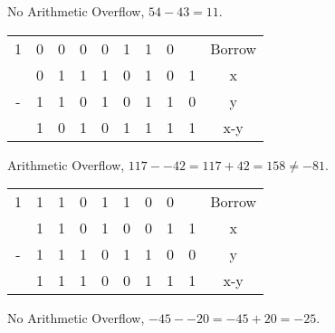 \documentclass[12pt]{article}
\begin{document}
\begin{enumerate}
\begin{enumerate}
\begin{center}
            No Arithmetic Overflow, $54-43 = 11$.

            \begin{tabular}{c c c c c c c c c c}
                \\
              1 & 0 & 0 & 0 & 0 & 1 & 1 & 0 && Borrow\\
                & 0 & 1 & 1 & 1 & 0 & 1 & 0 & 1 & x\\
              - & 1 & 1 & 0 & 1 & 0 & 1 & 1 & 0 & y\\
                \hline
                & 1 & 0 & 1 & 0 & 1 & 1 & 1 & 1 & x-y
            \end{tabular}

            Arithmetic Overflow, $117--42 = 117 + 42 = 158 \neq -81$.

            \begin{tabular}{c c c c c c c c c c}
                \\
              1 & 1 & 1 & 0 & 1 & 1 & 0 & 0 && Borrow\\
                & 1 & 1 & 0 & 1 & 0 & 0 & 1 & 1 & x\\
              - & 1 & 1 & 1 & 0 & 1 & 1 & 0 & 0 & y\\
                \hline
                & 1 & 1 & 1 & 0 & 0 & 1 & 1 & 1 & x-y
            \end{tabular}

            No Arithmetic Overflow, $-45- -20 = -45 + 20 = -25$.
          \end{center}
	      \end{enumerate}


\end{enumerate}
\end{document}
